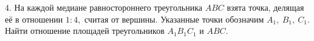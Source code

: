 4. На каждой медиане равностороннего треугольника $ABC$ взята точка, делящая её в отношении $1:4,$ считая от вершины. Указанные точки обозначим $A_1,\ B_1,\ C_1.$ Найти отношение площадей треугольников $A_1B_1C_1$ и $ABC.$\\
